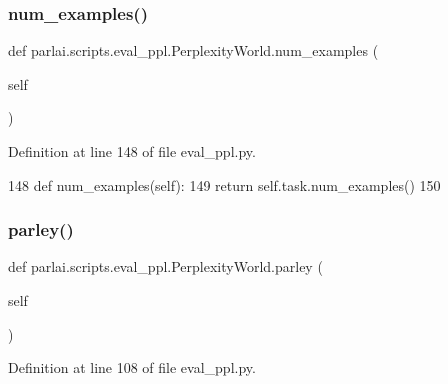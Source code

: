 \subsubsection{\texorpdfstring{num\+\_\+examples()}{num\_examples()}}
{\footnotesize\ttfamily def parlai.\+scripts.\+eval\+\_\+ppl.\+Perplexity\+World.\+num\+\_\+examples (\begin{DoxyParamCaption}\item[{}]{self }\end{DoxyParamCaption})}



Definition at line 148 of file eval\+\_\+ppl.\+py.


\begin{DoxyCode}
148     \textcolor{keyword}{def }num\_examples(self):
149         \textcolor{keywordflow}{return} self.task.num\_examples()
150 
\end{DoxyCode}
\mbox{\label{classparlai_1_1scripts_1_1eval__ppl_1_1PerplexityWorld_a9040f1a4e0d541a36970ca7c73f5591b}} 
\subsubsection{\texorpdfstring{parley()}{parley()}}
{\footnotesize\ttfamily def parlai.\+scripts.\+eval\+\_\+ppl.\+Perplexity\+World.\+parley (\begin{DoxyParamCaption}\item[{}]{self }\end{DoxyParamCaption})}



Definition at line 108 of file eval\+\_\+ppl.\+py.


